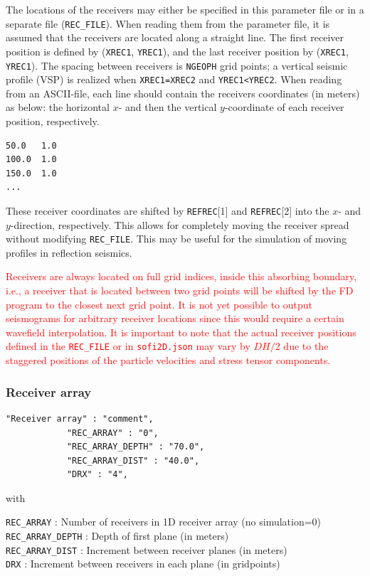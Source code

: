 The locations of the receivers may either be specified in this parameter file or in a separate file (\texttt{REC\_FILE}). When reading them from the parameter file, it is assumed that the receivers are located along a straight line. The first receiver position is defined by (\texttt{XREC1}, \texttt{YREC1}), and the last receiver position by (\texttt{XREC1}, \texttt{YREC1}). The spacing between receivers is \texttt{NGEOPH} grid points; a vertical seismic profile (VSP) is realized when \texttt{XREC1=XREC2} and \texttt{YREC1<YREC2}. When reading from an ASCII-file, each line should contain the receivers coordinates (in meters) as below: the horizontal $x$- and then the vertical $y$-coordinate of each receiver position, respectively.
\begin{verbatim}
50.0   1.0
100.0  1.0
150.0  1.0
...
\end{verbatim}

These receiver coordinates are shifted by \texttt{REFREC}[1] and \texttt{REFREC}[2] into the $x$- and $y$-direction, respectively. This allows for completely moving the receiver spread without modifying \texttt{REC\_FILE}. This may be useful for the simulation of moving profiles in reflection seismics.

\textcolor{red}{Receivers are always located on full grid indices, inside this absorbing boundary, i.e., a receiver that is located between two grid points will be shifted by the FD program to the closest next grid point. It is not yet possible to output seismograms for arbitrary receiver locations since this would require a certain wavefield interpolation. It is important to note that the actual receiver positions defined in the \texttt{REC\_FILE} or in \texttt{sofi2D.json} may vary by $DH/2$ due to the staggered positions of the particle velocities and stress tensor components.}

\subsubsection{Receiver array}
\begin{verbatim}
"Receiver array" : "comment",
            "REC_ARRAY" : "0",
            "REC_ARRAY_DEPTH" : "70.0",
            "REC_ARRAY_DIST" : "40.0", 
            "DRX" : "4",
\end{verbatim}

with

\texttt{REC\_ARRAY} : Number of receivers in 1D receiver array (no simulation=0)\\
\texttt{REC\_ARRAY\_DEPTH} : Depth of first plane (in meters)\\
\texttt{REC\_ARRAY\_DIST} : Increment between receiver planes (in meters)\\
\texttt{DRX} : Increment between receivers in each plane (in gridpoints)

